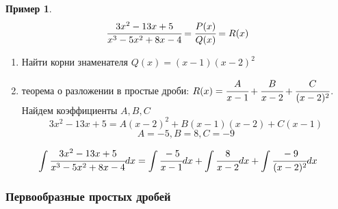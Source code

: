 \documentclass[a4paper]{article}
\theoremstyle{definition}
\newtheorem*{exmp}{Пример}
\newtheorem*{comment}{Замечание}
\newcommand\abs[1]{%
\mbox{$| #1 |$}}
\numberwithin{theorem}{subsection}
\numberwithin{lemma}{subsection}
\numberwithin{definition}{subsection}
\numberwithin{comment*}{subsection}
\numberwithin{consequence}{subsection}
\numberwithin{property}{subsection}
\begin{document}
\begin{exmp}
 $$ \cfrac{3x^2 - 13x + 5}{x^3 -5x^2 +8x -4} = \cfrac{P(x)}{Q(x)} = R(x)$$
 \begin{enumerate}
  \item Найти корни знаменателя
        $Q(x)=(x-1)(x-2)^2$
  \item теорема о разложении в простые дроби: $R(x) = \cfrac{A}{x-1}+ \cfrac{B}{x-2} + \cfrac{C}{(x-2)^2}$. Найдем коэффициенты $A, B, C$
        $$ 3x^2 - 13x + 5 = A(x-2)^2 + B(x-1)(x-2) + C(x-1)$$
        $$ A = -5, B = 8, C= -9$$
 \end{enumerate}
 $$ \int \cfrac{3x^2 - 13x + 5}{x^3 -5x^2 +8x -4} dx = \int \cfrac{-5}{x-1} dx + \int \cfrac{8}{x-2} dx + \int \cfrac{-9}{(x-2)^2} dx $$
\end{exmp}
\subsubsection{Первообразные простых дробей}

\end{document}

